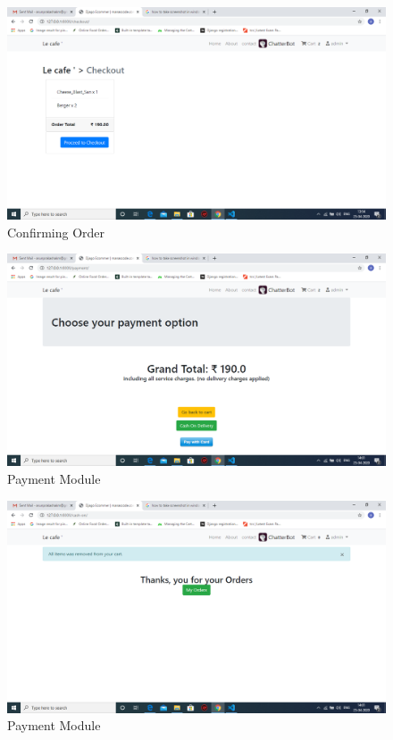 \documentclass[12pt,a4paper]{report}
\begin{document}
\begin{appendices}
\begin{figure}[h!]
	\centering
	\includegraphics[scale=0.3]{9}
	\caption{Confirming Order}
	\label{Architecture}
\end{figure}	

\begin{figure}[h!]
	\centering
	\includegraphics[scale=0.3]{10}
	\caption{Payment Module}
	\label{Architecture}
\end{figure}

\begin{figure}[h!]
	\centering
	\includegraphics[scale=0.3]{11}
	\caption{Payment Module}
	\label{Confirming Order}
	\end{figure}


\end{appendices}
\end{document}
